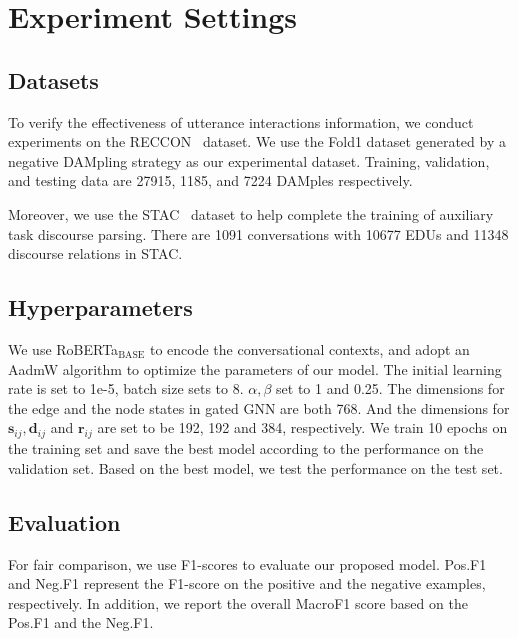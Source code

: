 \documentclass[11pt]{article}
\begin{document}
\section{Experiment Settings}\label{sec:experiments}
\subsection{Datasets}
To verify the effectiveness of utterance interactions information, we conduct experiments on the RECCON~\cite{poria2021recognizing} dataset. 
We use the Fold1 dataset \cite{poria2021recognizing} generated by a negative DAMpling strategy as our experimental dataset. 
Training, validation, and testing data are 27915, 1185, and 7224 DAMples respectively.

Moreover, we use the STAC~\cite{afantenosDiscourseParsingMultiparty2015} dataset to help complete the training of auxiliary task discourse parsing. 
There are 1091 conversations with 10677 EDUs and 11348 discourse relations in STAC.

\subsection{Hyperparameters}
We use RoBERTa$_{\textrm{BASE}}$ to encode the conversational contexts, and adopt an AadmW algorithm to optimize the parameters of our model.
The initial learning rate is set to 1e-5, batch size sets to 8.
$\alpha, \beta$ set to 1 and 0.25.
The dimensions for the edge and the node states in gated GNN are both 768.
And the dimensions for $\mathbf{s}_{ij}, \mathbf{d}_{ij}$ and $\mathbf{r}_{ij}$ are set to be 192, 192 and 384, respectively. 
We train 10 epochs on the training set and save the best model according to the performance on the validation set.
Based on the best model, we test the performance on the test set.

\subsection{Evaluation}
For fair comparison, we use F1-scores to evaluate our proposed model.
Pos.F1 and Neg.F1 represent the F1-score on the positive and the negative examples, respectively.
In addition, we report the overall MacroF1 score based on the Pos.F1 and the Neg.F1.
\end{document}
